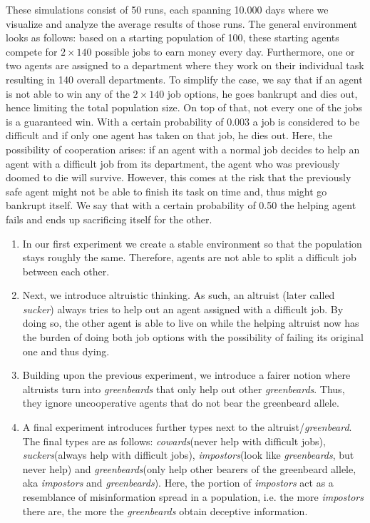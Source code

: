 \documentclass[sigconf]{acmart}
\newcommand{\VNumSimulations}{50\xspace}
\newcommand{\VNumDays}{10.000\xspace}
\newcommand{\VNumPop}{100\xspace}
\newcommand{\VNumTrees}{140\xspace}
\newcommand{\VProbPredator}{0.003\xspace}
\newcommand{\VProbAltruistDies}{0.50\xspace}
\newcommand{\cowards}{\textit{cowards}\xspace}
\newcommand{\suckers}{\textit{suckers}\xspace}
\newcommand{\sucker}{\textit{sucker}\xspace}
\newcommand{\impostors}{\textit{impostors}\xspace}
\newcommand{\greenbeards}{\textit{greenbeards}\xspace}
\newcommand{\greenbeard}{\textit{greenbeard}\xspace}
\begin{document}
    These simulations consist of \VNumSimulations runs, each spanning \VNumDays days where we visualize and analyze the average results of those runs.
    The general environment looks as follows: based on a starting population of \VNumPop, these starting agents compete for $2 \times \VNumTrees$ possible jobs to earn money every day.
    Furthermore, one or two agents are assigned to a department where they work on their individual task resulting in \VNumTrees overall departments.
    To simplify the case, we say that if an agent is not able to win any of the $2 \times \VNumTrees$ job options, he goes bankrupt and dies out, hence limiting the total population size.
    On top of that, not every one of the jobs is a guaranteed win.
    With a certain probability of \VProbPredator a job is considered to be difficult and if only one agent has taken on that job, he dies out.
    Here, the possibility of cooperation arises: if an agent with a normal job decides to help an agent with a difficult job from its department, the agent who was previously doomed to die will survive.
    However, this comes at the risk that the previously safe agent might not be able to finish its task on time and, thus might go bankrupt itself.
    We say that with a certain probability of \VProbAltruistDies the helping agent fails and ends up sacrificing itself for the other.


    \begin{enumerate}
        \item In our first experiment we create a stable environment so that the population stays roughly the same.
        Therefore, agents are not able to split a difficult job between each other.

        \item Next, we introduce altruistic thinking.
        As such, an altruist (later called \sucker) always tries to help out an agent assigned with a difficult job.
        By doing so, the other agent is able to live on while the helping altruist now has the burden of doing both job options with the possibility of failing its original one and thus dying.

        \item Building upon the previous experiment, we introduce a fairer notion where altruists turn into \greenbeards that only help out other \greenbeards.
        Thus, they ignore uncooperative agents that do not bear the greenbeard allele.

        \item A final experiment introduces further types next to the altruist/\greenbeard.
        The final types are as follows: \cowards (never help with difficult jobs), \suckers (always help with difficult jobs), \impostors (look like \greenbeards, but never help) and \greenbeards (only help other bearers of the greenbeard allele, aka \impostors and \greenbeards).
        Here, the portion of \impostors act as a resemblance of misinformation spread in a population, i.e. the more \impostors there are, the more the \greenbeards obtain deceptive information.

    \end{enumerate}
\end{document}

